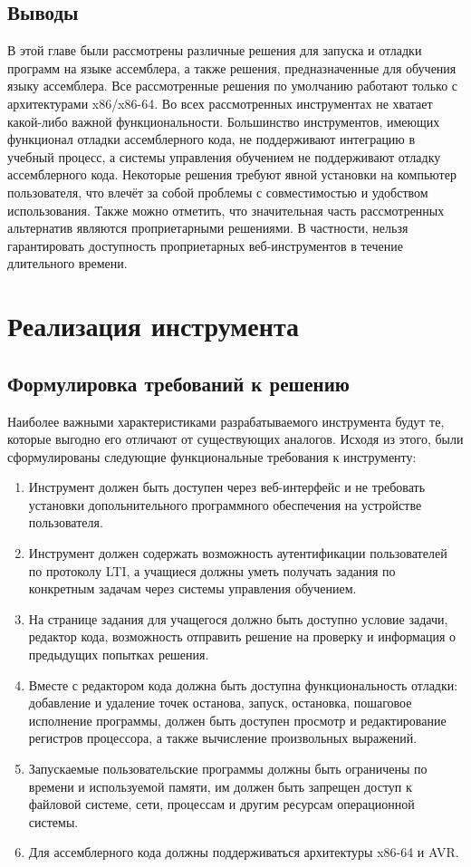 \documentclass[a4paper,article,14pt]{extarticle}
\begin{document}
\subsection{Выводы}

В этой главе были рассмотрены различные решения для запуска и отладки программ на языке ассемблера, а также решения, предназначенные для обучения языку ассемблера. Все рассмотренные решения по умолчанию работают только с архитектурами x86/x86-64. Во всех рассмотренных инструментах не хватает какой-либо важной функциональности. Большинство инструментов, имеющих функционал отладки ассемблерного кода, не поддерживают интеграцию в учебный процесс, а системы управления обучением не поддерживают отладку ассемблерного кода. Некоторые решения требуют явной установки на компьютер пользователя, что влечёт за собой проблемы с совместимостью и удобством использования. Также можно отметить, что значительная часть рассмотренных альтернатив являются проприетарными решениями. В частности, нельзя гарантировать доступность проприетарных веб-инструментов в течение длительного времени.

\pagebreak
\section{Реализация инструмента}

\subsection{Формулировка требований к решению}

Наиболее важными характеристиками разрабатываемого инструмента будут те, которые выгодно его отличают от существующих аналогов. Исходя из этого, были сформулированы следующие функциональные требования к инструменту:

\begin{enumerate}
    \item Инструмент должен быть доступен через веб-интерфейс и не требовать установки допольнительного программного обеспечения на устройстве пользователя.
    \item Инструмент должен содержать возможность аутентификации пользователей по протоколу LTI, а учащиеся должны уметь получать задания по конкретным задачам через системы управления обучением.
    \item На странице задания для учащегося должно быть доступно условие задачи, редактор кода, возможность отправить решение на проверку и информация о предыдущих попытках решения.
    \item Вместе с редактором кода должна быть доступна функциональность отладки: добавление и удаление точек останова, запуск, остановка, пошаговое исполнение программы, должен быть доступен просмотр и редактирование регистров процессора, а также вычисление произвольных выражений.
    \item Запускаемые пользовательские программы должны быть ограничены по времени и используемой памяти, им должен быть запрещен доступ к файловой системе, сети, процессам и другим ресурсам операционной системы.
    \item Для ассемблерного кода должны поддерживаться архитектуры x86-64 и AVR.
\end{enumerate}
\end{document}
